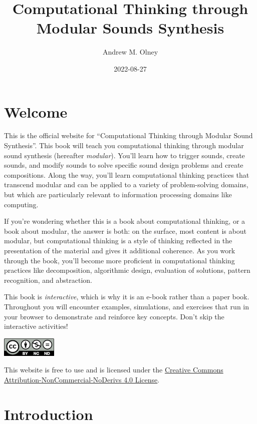 \documentclass[
]{book}
\title{Computational Thinking through Modular Sounds Synthesis}
\author{Andrew M. Olney}
\date{2022-08-27}
\begin{document}
\maketitle

{
\hypersetup{linkcolor=}
\setcounter{tocdepth}{1}
\tableofcontents
}
\hypertarget{welcome}{%
\chapter*{Welcome}\label{welcome}}

This is the official website for ``Computational Thinking through Modular Sound Synthesis''. This book will teach you computational thinking through modular sound synthesis (hereafter \emph{modular}). You'll learn how to trigger sounds, create sounds, and modify sounds to solve specific sound design problems and create compositions. Along the way, you'll learn computational thinking practices that transcend modular and can be applied to a variety of problem-solving domains, but which are particularly relevant to information processing domains like computing.

If you're wondering whether this is a book about computational thinking, or a book about modular, the answer is both: on the surface, most content is about modular, but computational thinking is a style of thinking reflected in the presentation of the material and gives it additional coherence. As you work through the book, you'll become more proficient in computational thinking practices like decomposition, algorithmic design, evaluation of solutions, pattern recognition, and abstraction.

This book is \emph{interactive}, which is why it is an e-book rather than a paper book. Throughout you will encounter examples, simulations, and exercises that run in your browser to demonstrate and reinforce key concepts. Don't skip the interactive activities!

\includegraphics{images/by-nc-nd.png}

This website is free to use and is licensed under the \href{https://creativecommons.org/licenses/by-nc-nd/4.0/}{Creative Commons Attribution-NonCommercial-NoDerivs 4.0 License}.

\hypertarget{introduction}{%
\chapter{Introduction}\label{introduction}}
\end{document}
